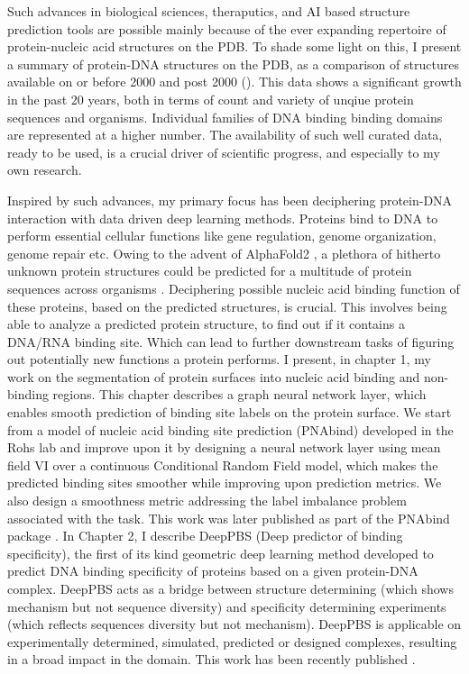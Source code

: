 Such advances in biological sciences, theraputics, and AI based structure prediction tools are possible mainly because of the ever expanding repertoire of protein-nucleic acid structures on the PDB. To shade some light on this, I present a summary of protein-DNA structures on the PDB, as a comparison of structures available on or before 2000 and post 2000 (). This data shows a significant growth in the past 20 years,  both in terms of count and variety of unqiue protein sequences and organisms. Individual families of DNA binding binding domains are represented at a higher number. The availability of such well curated data, ready to be used, is a crucial driver of scientific progress, and especially to my own research.

Inspired by such advances, my primary focus has been deciphering protein-DNA interaction with data driven deep learning methods. Proteins bind to DNA to perform essential cellular functions like gene regulation, genome organization, genome repair etc. Owing to the advent of AlphaFold2 \citep{Jumper2021}, a plethora of hitherto unknown protein structures could be predicted for a multitude of protein sequences across organisms \citep{varadi2022alphafold}. Deciphering possible nucleic acid binding function of these proteins, based on the predicted structures, is crucial. This involves being able to analyze a predicted protein structure, to find out if it contains a DNA/RNA binding site. Which can lead to further downstream tasks of figuring out potentially new functions a protein performs. I present, in chapter 1,
my work on the segmentation of protein surfaces into nucleic acid binding and non-binding regions. This chapter describes a graph neural network layer, which enables smooth prediction of binding site labels on the protein surface. We start from a model of nucleic acid binding site prediction (PNAbind) developed in the Rohs lab and improve upon it by designing a neural network layer using mean field VI over a continuous Conditional Random Field model, which makes the predicted binding sites smoother while improving upon prediction metrics. We also design a smoothness metric addressing the label imbalance problem associated with the task. This work was later published as part of the PNAbind package \citep{Sagendorf2024}.
In Chapter 2, I describe DeepPBS (Deep predictor of binding specificity), the first of its kind geometric deep learning method developed to predict DNA binding specificity of proteins based on a given protein-DNA complex. DeepPBS acts as a bridge between structure determining (which shows mechanism but not sequence diversity) and specificity determining experiments (which reflects sequences diversity but not mechanism). DeepPBS is applicable on experimentally determined, simulated, predicted or designed complexes, resulting in a broad impact in the domain. This work has been recently published \citep{Mitra2024}.

